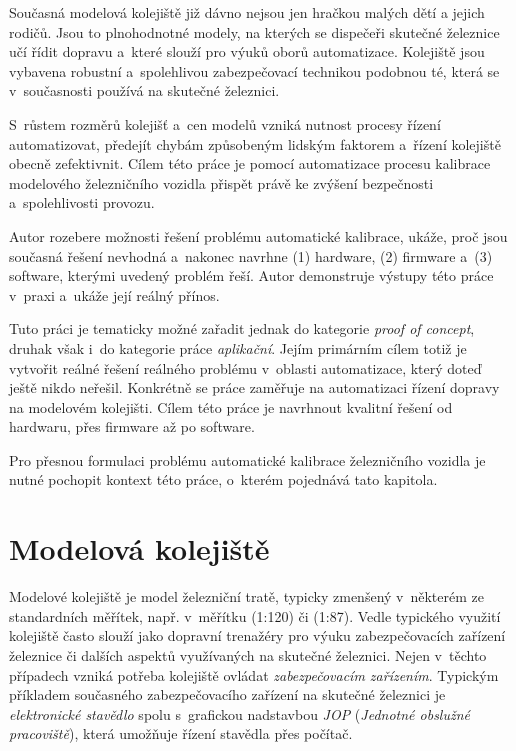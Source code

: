 Současná modelová kolejiště již dávno nejsou jen hračkou malých dětí
a jejich rodičů. Jsou to plnohodnotné modely, na kterých se dispečeři skutečné
železnice učí řídit dopravu a~které slouží pro výuků oborů automatizace.
Kolejiště jsou vybavena robustní a~spolehlivou zabezpečovací technikou
podobnou té, která se v~současnosti používá na skutečné železnici.

S~růstem rozměrů kolejišť a~cen modelů vzniká nutnost procesy řízení
automatizovat, předejít chybám způsobeným lidským faktorem a~řízení kolejiště
obecně zefektivnit. Cílem této práce je pomocí automatizace procesu kalibrace
modelového železničního vozidla přispět právě ke zvýšení bezpečnosti
a~spolehlivosti provozu.

Autor rozebere možnosti řešení problému automatické kalibrace, ukáže, proč jsou
současná řešení nevhodná a~nakonec navrhne (1) hardware, (2) firmware a~(3)
software, kterými uvedený problém řeší. Autor demonstruje výstupy této práce
v~praxi a~ukáže její reálný přínos.

Tuto práci je tematicky možné zařadit jednak do kategorie \textit{proof of
concept}, druhak však i~do kategorie práce \textit{aplikační}. Jejím primárním
cílem totiž je vytvořit reálné řešení reálného problému v~oblasti automatizace,
který doteď ještě nikdo neřešil. Konkrétně se práce zaměřuje na automatizaci
řízení dopravy na modelovém kolejišti. Cílem této práce je navrhnout kvalitní
řešení od hardwaru, přes firmware až po software.

Pro přesnou formulaci problému automatické kalibrace železničního vozidla je
nutné pochopit kontext této práce, o~kterém pojednává tato kapitola.

\section{Modelová kolejiště}
\label{sec:mod-kol}

Modelové kolejiště je model železniční tratě, typicky zmenšený
v~některém ze standardních měřítek, např. v~měřítku  (1:120) či 
(1:87). Vedle typického  využití kolejiště často slouží jako dopravní
trenažéry pro výuku zabezpečovacích zařízení železnice či dalších aspektů
využívaných na skutečné železnici. Nejen v~těchto případech vzniká potřeba
kolejiště ovládat \textit{zabezpečovacím zařízením}. Typickým příkladem
současného zabezpečovacího zařízení na skutečné železnici je
\textit{elektronické stavědlo} spolu s~grafickou nadstavbou
\textit{JOP} (\textit{Jednotné obslužné pracoviště}), která umožňuje řízení
stavědla přes počítač.

